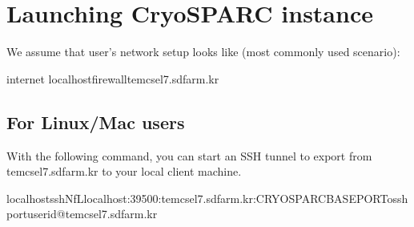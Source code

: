\documentclass[a4paper,10pt,english]{sphinxmanual}
\begin{document}
\section{Launching CryoSPARC instance}
\label{\detokenize{cryoSPARC:launching-cryosparc-instance}}
\sphinxAtStartPar
We assume that user’s network setup looks like (most commonly used scenario):

\begin{sphinxVerbatim}[commandchars=\\\{\}]
internet
\PYG{o}{[}localhost\PYG{o}{]}\PYG{o}{[}firewalltem\PYGZhy{}cs\PYGZhy{}el7.sdfarm.kr\PYG{o}{]}
\end{sphinxVerbatim}


\subsection{For Linux/Mac users}
\label{\detokenize{cryoSPARC:for-linux-mac-users}}
\sphinxAtStartPar
With the following command, you can start an SSH tunnel to export  from tem\sphinxhyphen{}cs\sphinxhyphen{}el7.sdfarm.kr to your local client machine.

\begin{sphinxVerbatim}[commandchars=\\\{\}]
localhost\PYGZdl{}\PYGZgt{}ssh\PYGZhy{}N\PYGZhy{}f\PYGZhy{}Llocalhost:39500:tem\PYGZhy{}cs\PYGZhy{}el7.sdfarm.kr:\PYGZlt{}CRYOSPARC\PYGZus{}BASE\PYGZus{}PORT\PYGZgt{}\PYGZhy{}o\PYGZlt{}ssh\PYGZus{}port\PYGZgt{}\PYGZlt{}userid\PYGZgt{}@tem\PYGZhy{}cs\PYGZhy{}el7.sdfarm.kr

\end{sphinxVerbatim}
\end{document}
